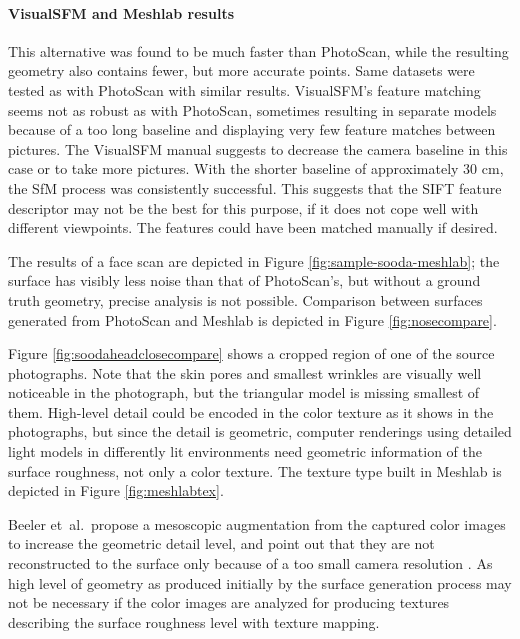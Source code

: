 \paragraph{VisualSFM and Meshlab results}
This alternative was found to be much faster than PhotoScan, while the resulting geometry also contains fewer, but more accurate points.
Same datasets were tested as with PhotoScan with similar results.
VisualSFM's feature matching seems not as robust as with PhotoScan, sometimes resulting in separate models because of a too long baseline and displaying very few feature matches between pictures.
The VisualSFM manual suggests to decrease the camera baseline in this case or to take more pictures.
With the shorter baseline of approximately 30 cm, the SfM process was consistently successful.
This suggests that the SIFT feature descriptor may not be the best for this purpose, if it does not cope well with different viewpoints.
The features could have been matched manually if desired.

The results of a face scan are depicted in Figure \ref{fig:sample-sooda-meshlab}; the surface has visibly less noise than that of PhotoScan's, but without a ground truth geometry, precise analysis is not possible.
Comparison between surfaces generated from PhotoScan and Meshlab is depicted in Figure \ref{fig:nosecompare}.

Figure \ref{fig:soodaheadclosecompare} shows a cropped region of one of the source photographs.
Note that the skin pores and smallest wrinkles are visually well noticeable in the photograph, but the triangular model is missing smallest of them.
High-level detail could be encoded in the color texture as it shows in the photographs, but since the detail is geometric, computer renderings using detailed light models in differently lit environments need geometric information of the surface roughness, not only a color texture.
The texture type built in Meshlab is depicted in Figure \ref{fig:meshlabtex}.

Beeler et~al.\ propose a mesoscopic augmentation from the captured color images to increase the geometric detail level, and point out that they are not reconstructed to the surface only because of a too small camera resolution \cite{beeler2010high}.
As high level of geometry as produced initially by the surface generation process may not be necessary if the color images are analyzed for producing textures describing the surface roughness level with texture mapping.


